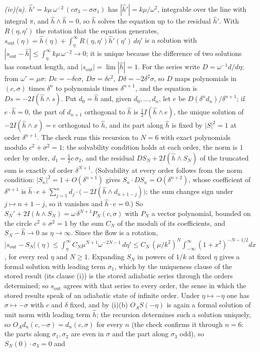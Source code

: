 \emph{(iv)(a).} $\hat h' = k\mu\,\omega^{-2}\,(c\sigma_{3} - \sigma\sigma_{1})$ has $|\hat h'| = k\mu/\omega^{2}$, integrable over the line with integral $\pi$, and $\hat h\wedge\hat h = 0$, so $\hat h$ solves the equation up to the residual $\hat h'$. With $R(\eta, \eta')$ the rotation that the equation generates, $s_{\mathrm{out}}(\eta) = \hat h(\eta) + \int_{\eta}^{\infty}R(\eta, \eta')\hat h'(\eta')\,d\eta'$ is a solution with $|s_{\mathrm{out}} - \hat h| \le \int_{\eta}^{\infty}k\mu\,\omega^{-2} \to 0$; it is unique because the difference of two solutions has constant length, and $|s_{\mathrm{out}}| = \lim|\hat h| = 1$. For the series write $D = \omega^{-1}d/d\eta$; from $\omega' = \mu\sigma$: $Dc = -\delta c\sigma$, $D\sigma = \delta c^{2}$, $D\delta = -2\delta^{2}\sigma$, so $D$ maps polynomials in $(c, \sigma)$ times $\delta^{n}$ to polynomials times $\delta^{n+1}$, and the equation is $Ds = -2I(\hat h\wedge s)$. Put $d_{0} = \hat h$ and, given $d_{0}, \dots, d_{n}$, let $e$ be $D(\delta^{n}d_{n})/\delta^{n+1}$; if $e\cdot\hat h = 0$, the part of $d_{n+1}$ orthogonal to $\hat h$ is $\tfrac12I(\hat h\wedge e)$, the unique solution of $-2I(\hat h\wedge x) = e$ orthogonal to $\hat h$, and its part along $\hat h$ is fixed by $|S|^{2} = 1$ at order $\delta^{n+1}$. The check runs this recursion to $N = 6$ with exact polynomials modulo $c^{2} + \sigma^{2} = 1$: the solvability condition holds at each order, the norm is $1$ order by order, $d_{1} = \tfrac12c\,\sigma_{2}$, and the residual $DS_{N} + 2I(\hat h\wedge S_{N})$ of the truncated sum is exactly of order $\delta^{N+1}$. (Solvability at every order follows from the norm condition: $|S_{n}|^{2} = 1 + O(\delta^{n+1})$ gives $S_{n}\cdot DS_{n} = O(\delta^{n+2})$, whose coefficient of $\delta^{n+1}$ is $\hat h\cdot e + \sum_{j=1}^{n}d_{j}\cdot\bigl(-2I(\hat h\wedge d_{n+1-j})\bigr)$; the sum changes sign under $j \mapsto n + 1 - j$, so it vanishes and $\hat h\cdot e = 0$.) So $S_{N}' + 2I(h\wedge S_{N}) = \omega\,\delta^{N+1}P_{N}(c, \sigma)$ with $P_{N}$ a vector polynomial, bounded on the circle $c^{2} + \sigma^{2} = 1$ by the sum $C_{N}$ of the moduli of its coefficients, and $S_{N} - \hat h \to 0$ as $\eta \to \infty$. Since the flow is a rotation, $|s_{\mathrm{out}} - S_{N}|(\eta) \le \int_{\eta}^{\infty}C_{N}\mu^{N+1}\omega^{-2N-1}\,d\eta' \le C_{N}\,(\mu/k^{2})^{N}\int_{-\infty}^{\infty}(1 + x^{2})^{-N-1/2}dx$, for every real $\eta$ and $N \ge 1$. Expanding $S_{N}$ in powers of $1/k$ at fixed $\eta$ gives a formal solution with leading term $\sigma_{1}$, which by the uniqueness clause of the stored result (its clause (i)) is the stored adiabatic series through the orders determined; so $s_{\mathrm{out}}$ agrees with that series to every order, the sense in which the stored results speak of an adiabatic state of infinite order. Under $\eta \mapsto -\eta$ one has $\sigma \mapsto -\sigma$ with $c$ and $\delta$ fixed, and by (i)(b) $O_{A}S(-\eta)$ is again a formal solution of unit norm with leading term $\hat h$; the recursion determines such a solution uniquely, so $O_{A}d_{n}(c, -\sigma) = d_{n}(c, \sigma)$ for every $n$ (the check confirms it through $n = 6$: the parts along $\sigma_{1}, \sigma_{2}$ are even in $\sigma$ and the part along $\sigma_{3}$ odd), so $S_{N}(0)\cdot\sigma_{3} = 0$ and 